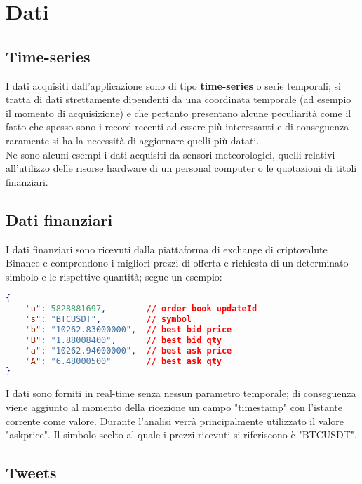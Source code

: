 \section{Dati}

\subsection{Time-series}

I dati acquisiti dall'applicazione sono di tipo \textbf{time-series} o serie
temporali; si tratta di dati strettamente dipendenti da una coordinata temporale (ad esempio
il momento di acquisizione) e che pertanto presentano alcune peculiarità come il fatto
che spesso sono i record recenti ad essere più interessanti e di conseguenza raramente si ha
la necessità di aggiornare quelli più datati.
\\
Ne sono alcuni esempi i dati acquisiti da sensori meteorologici, quelli relativi
all'utilizzo delle risorse hardware di un personal computer o le quotazioni di titoli finanziari.

\subsection{Dati finanziari}

I dati finanziari sono ricevuti dalla piattaforma di exchange di criptovalute Binance \cite{binance}
e comprendono i migliori prezzi di offerta e richiesta di un determinato simbolo e le rispettive
quantità; segue un esempio:

\begin{lstlisting}[language=json,firstnumber=1]
{
    "u": 5828881697,        // order book updateId
    "s": "BTCUSDT",         // symbol
    "b": "10262.83000000",  // best bid price
    "B": "1.88008400",      // best bid qty
    "a": "10262.94000000",  // best ask price
    "A": "6.48000500"       // best ask qty
}
\end{lstlisting}
%
I dati sono forniti in real-time senza nessun parametro temporale; di conseguenza viene
aggiunto al momento della ricezione un campo "timestamp" con l'istante corrente come valore.
Durante l'analisi verrà principalmente utilizzato il valore "askprice".
Il simbolo scelto al quale i prezzi ricevuti si riferiscono è "BTCUSDT".

\subsection{Tweets}

